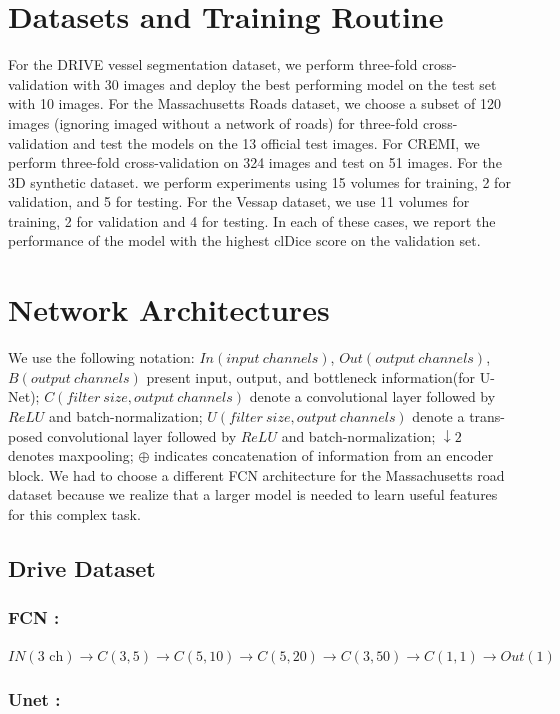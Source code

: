 \section{Datasets and Training Routine}

For the DRIVE vessel segmentation dataset, we perform three-fold cross-validation with 30 images and deploy the best performing model on the test set with 10 images. For the Massachusetts Roads dataset, we choose a subset of  120 images (ignoring imaged without a network of roads) for three-fold cross-validation and test the models on the 13 official test images.  For CREMI, we perform three-fold cross-validation on 324 images and test on 51 images. For the 3D synthetic dataset. we perform experiments using 15 volumes for training, 2 for validation, and 5 for testing.
For the Vessap dataset, we use 11 volumes for training, 2 for validation and 4 for testing. In each of these cases, we report the performance of the model with the highest clDice score on the validation set.


\section{Network Architectures} 
We use the following notation: $In(input~channels)$, $Out(output~channels)$, \\ $B(output~channels)$ present input, output, and bottleneck information(for U-Net); $C(filter~size, output~channels)$ denote a convolutional layer followed by $ReLU$ and batch-normalization; $U(filter~size, output~channels)$ denote a trans-posed convolutional layer followed by $ReLU$ and batch-normalization; $\downarrow 2$ denotes maxpooling; $\oplus$ indicates concatenation of information from an encoder block. We had to choose a different FCN architecture for the Massachusetts road dataset because we realize that a larger model is needed to learn useful features for this complex task.

\subsection{Drive Dataset}
\subsubsection{FCN :}
$IN(\mbox{3 ch})\rightarrow C(3,5)\rightarrow C(5,10) \rightarrow C(5,20)\rightarrow C(3,50)\rightarrow C(1,1)\rightarrow Out(1)$
\subsubsection{Unet :}
